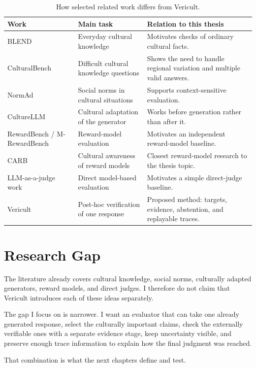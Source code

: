 \begin{table}[ht]
\centering
\small
\caption{How selected related work differs from Vericult.}
\label{tab:prior-work}
\begin{tabularx}{\textwidth}{p{}X X}
\toprule
Work & Main task & Relation to this thesis \\
\midrule
BLEND & Everyday cultural knowledge & Motivates checks of ordinary cultural facts. \\
CulturalBench & Difficult cultural knowledge questions & Shows the need to handle regional variation and multiple valid answers. \\
NormAd & Social norms in cultural situations & Supports context-sensitive evaluation. \\
CultureLLM & Cultural adaptation of the generator & Works before generation rather than after it. \\
RewardBench / M-RewardBench & Reward-model evaluation & Motivates an independent reward-model baseline. \\
CARB & Cultural awareness of reward models & Closest reward-model research to the thesis topic. \\
LLM-as-a-judge work & Direct model-based evaluation & Motivates a simple direct-judge baseline. \\
Vericult & Post-hoc verification of one response & Proposed method: targets, evidence, abstention, and replayable traces. \\
\bottomrule
\end{tabularx}
\end{table}

\section{Research Gap}

The literature already covers cultural knowledge, social norms, culturally adapted generators, reward models, and direct judges. I therefore do not claim that Vericult introduces each of these ideas separately.

The gap I focus on is narrower. I want an evaluator that can take one already generated response, select the culturally important claims, check the externally verifiable ones with a separate evidence stage, keep uncertainty visible, and preserve enough trace information to explain how the final judgment was reached.

That combination is what the next chapters define and test.
